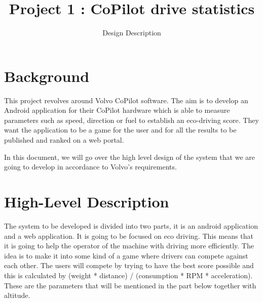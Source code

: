 \documentclass{article}
\author{Design Description}
\title{Project 1 : CoPilot drive statistics}
\begin{document}
\maketitle

\tableofcontents

\newpage

\section{Background}

This project revolves around Volvo CoPilot software. The aim is to develop an Android application for their CoPilot hardware which is able to measure parameters such as speed, direction or fuel to establish an eco-driving score. They want the application to be a game for the user and for all the results to be published and ranked on a web portal. 

In this document, we will go over the high level design of the system that we are going to develop in accordance to Volvo’s requirements.

\section{High-Level Description}

The system to be developed is divided into two parts, it is an android application and a web application. It is going to be focused on eco driving. This means that it is going to help the operator of the machine with driving more efficiently. The idea is to make it into some kind of a game where drivers can compete against each other. The users will compete by trying to have the best score possible and this is calculated by (weight * distance) / (consumption * RPM * acceleration). These are the parameters that will be mentioned in the part below together with altitude.
 
\end{document}
